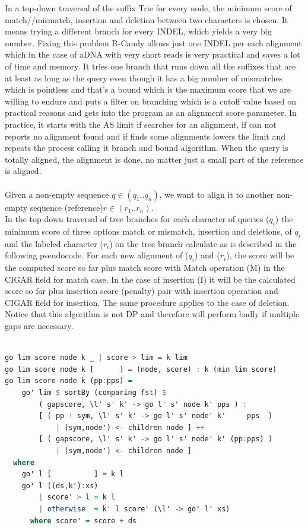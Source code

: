 \documentclass[11pt,a4paper]{report}
\begin{document}
In a top-down traversal of the suffix Trie  
for every node, the minimum score of 
 match//mismatch, insertion and deletion between two 
characters is chosen.
It means trying a different branch for every INDEL, 
which yields a very big number.
 Fixing this problem 
R-Candy allows just one INDEL per each alignment which
in the case of aDNA with very short reads is very practical
and saves a lot of time and memory.
It tries one branch that runs down all the suffixes that are
at least as long as the query even though it has a big 
number of mismatches which is pointless and that's a
bound which is the maximum score that we are willing 
to endure and puts a filter on branching which is a cutoff 
value based on practical reasons and gets into the program
as an alignment score parameter. In practice, it starts with 
the AS limit if searches for an alignment, if can not reports 
no alignment found and if finds some alignments lowers the 
limit and repeats the process calling it branch and bound
algorithm.
 When the query is totally aligned, the alignment is 
done, no matter just a small part of the reference is aligned.
\\\\
Given a non-empty sequence $q\in (q_{1}..q_{n})$, we want to align it to 
another non-empty sequence (reference)$r\in (r_{1}..r_{n})$.\\
In the top-down traversal of tree branches for each character 
of queries ($q_{i}$) the minimum score of three options match or mismatch, 
insertion and deletions, of $q_{i}$  and the labeled character ($r_{i}$)
on the tree branch calculate as is described in the following pseudocode.
For each new alignment of ($q_{i}$) and ($r_{i}$), the score will be the
computed score so far plus match score with Match operation (M) in the 
CIGAR field \cite{samtools} for match case. In the case of insertion (I) 
it will be the calculated score so far plus insertion score (penalty) pair 
with insertion operation and CIGAR field for insertion.
The same procedure applies to the case of deletion.
Notice that this algorithm is not DP and therefore will
perform badly if multiple gaps are necessary.\\


\begin{lstlisting}[language=Haskell, basicstyle=\ttfamily\scriptsize, 
keywordstyle=\color{red}, frame=single ]

go lim score node k _ | score > lim = k lim
go lim score node k [      ] = (node, score) : k (min lim score)
go lim score node k (pp:pps) =
    go' lim $ sortBy (comparing fst) $
        ( gapscore, \l' s' k' -> go l' s' node k' pps ) :                   
        [ ( pp ! sym, \l' s' k' -> go l' s' node' k'     pps  )
            | (sym,node') <- children node ] ++
        [ ( gapscore, \l' s' k' -> go l' s' node' k' (pp:pps) ) 
            | (sym,node') <- children node ]
  where
    go' l [          ] = k l
    go' l ((ds,k'):xs)
        | score' > l = k l               
        | otherwise  = k' l score' (\l' -> go' l' xs)
      where score' = score + ds

\end{lstlisting}
\end{document}
